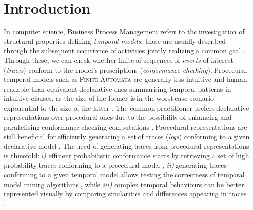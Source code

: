 \documentclass[sigconf]{acmart}
\begin{document}
\section{Introduction} 
In computer science, Business Process Management refers to the investigation of structural properties defining \textit{temporal models}; those are usually described through the subsequent occurrence of activities jointly realizing a common goal \cite{DBLP:books/sp/Weske19}.  Through these, we can check whether finite of sequences of \textit{events} of interest (\textit{traces}) conform to the model's prescriptions (\textit{conformance checking}). Procedural temporal models such as \textsc{Finite Automata} are generally less intuitive and human-readable than equivalent declarative ones summarising temporal patterns in intuitive clauses, as the size of the former is in the worst-case scenario exponential to the size of the latter \cite{ltlfnfa}. The common practitioner prefers declarative representations over procedural ones due to the possibility of enhancing and parallelising conformance-checking computations \cite{info14030173}. Procedural representations are still beneficial for efficiently generating a set of traces (\textit{logs}) conforming to a given declarative model  \cite{DBLP:conf/caise/CiccioBCM15}. The need of generating traces from procedural representations is threefold: \textit{i)} efficient probabilistic conformance starts by retrieving a set of high probability  traces conforming to a procedural model \cite{DBLP:conf/icpm/BergamiMMP21}, \textit{ii)} generating traces conforming to a given temporal model allows testing the correctness of temporal model mining algorithms \cite{DBLP:conf/caise/CiccioBCM15,DBLP:conf/ideas/ApplebyBM23}, while \textit{iii)} complex temporal  behaviours can be better represented visually by comparing similarities and differences appearing in traces \cite{8387499}.
\end{document}
